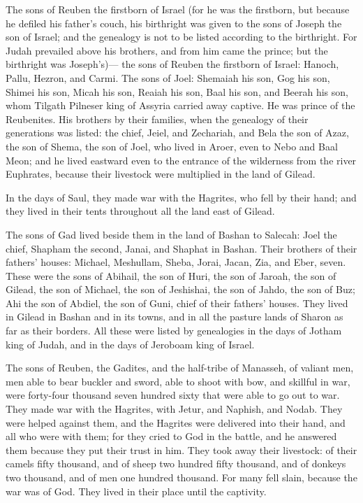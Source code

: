  The sons of Reuben the firstborn of Israel (for he was
the firstborn, but because he defiled his father's couch, his birthright
was given to the sons of Joseph the son of Israel; and the genealogy is
not to be listed according to the birthright.  For Judah
prevailed above his brothers, and from him came the prince; but the
birthright was Joseph's)---  the sons of Reuben the
firstborn of Israel: Hanoch, Pallu, Hezron, and Carmi. 
The sons of Joel: Shemaiah his son, Gog his son, Shimei his son,
 Micah his son, Reaiah his son, Baal his son,
 and Beerah his son, whom Tilgath Pilneser king of Assyria
carried away captive. He was prince of the Reubenites. 
His brothers by their families, when the genealogy of their generations
was listed: the chief, Jeiel, and Zechariah,  and Bela the
son of Azaz, the son of Shema, the son of Joel, who lived in Aroer, even
to Nebo and Baal Meon;  and he lived eastward even to the
entrance of the wilderness from the river Euphrates, because their
livestock were multiplied in the land of Gilead.

 In the days of Saul, they made war with the Hagrites,
who fell by their hand; and they lived in their tents throughout all the
land east of Gilead.

 The sons of Gad lived beside them in the land of Bashan
to Salecah:  Joel the chief, Shapham the second, Janai,
and Shaphat in Bashan.  Their brothers of their fathers'
houses: Michael, Meshullam, Sheba, Jorai, Jacan, Zia, and Eber, seven.
 These were the sons of Abihail, the son of Huri, the son
of Jaroah, the son of Gilead, the son of Michael, the son of Jeshishai,
the son of Jahdo, the son of Buz;  Ahi the son of Abdiel,
the son of Guni, chief of their fathers' houses.  They
lived in Gilead in Bashan and in its towns, and in all the pasture lands
of Sharon as far as their borders.  All these were listed
by genealogies in the days of Jotham king of Judah, and in the days of
Jeroboam king of Israel.

 The sons of Reuben, the Gadites, and the half-tribe of
Manasseh, of valiant men, men able to bear buckler and sword, able to
shoot with bow, and skillful in war, were forty-four thousand seven
hundred sixty that were able to go out to war.  They made
war with the Hagrites, with Jetur, and Naphish, and Nodab.
 They were helped against them, and the Hagrites were
delivered into their hand, and all who were with them; for they cried to
God in the battle, and he answered them because they put their trust in
him.  They took away their livestock: of their camels
fifty thousand, and of sheep two hundred fifty thousand, and of donkeys
two thousand, and of men one hundred thousand.  For many
fell slain, because the war was of God. They lived in their place until
the captivity.

